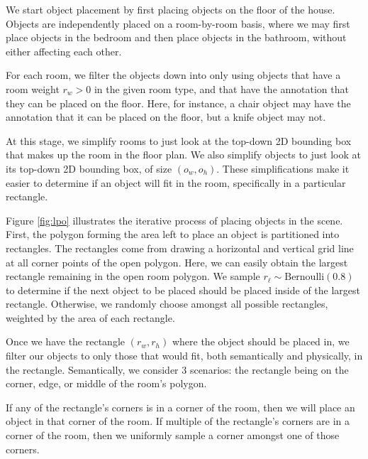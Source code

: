 We start object placement by first placing objects on the floor of the house. Objects are independently placed on a room-by-room basis, where we may first place objects in the bedroom and then place objects in the bathroom, without either affecting each other.

For each room, we filter the objects down into only using objects that have a room weight $r_w > 0$ in the given room type, and that have the annotation that they can be placed on the floor. Here, for instance, a chair object may have the annotation that it can be placed on the floor, but a knife object may not.


At this stage, we simplify rooms to just look at the top-down 2D bounding box that makes up the room in the floor plan. We also simplify objects to just look at its top-down 2D bounding box, of size $(o_w, o_h)$. These simplifications make it easier to determine if an object will fit in the room, specifically in a particular rectangle.

Figure \ref{fig:lpo} illustrates the iterative process of placing objects in the scene. First, the polygon forming the area left to place an object is partitioned into rectangles. The rectangles come from drawing a horizontal and vertical grid line at all corner points of the open polygon. Here, we can easily obtain the largest rectangle remaining in the open room polygon. We sample $r_\ell\sim \text{Bernoulli}(0.8)$ to determine if the next object to be placed should be placed inside of the largest rectangle. Otherwise, we randomly choose amongst all possible rectangles, weighted by the area of each rectangle.

Once we have the rectangle $(r_w, r_h)$ where the object should be placed in, we filter our objects to only those that would fit, both semantically and physically, in the rectangle. Semantically, we consider 3 scenarios: the rectangle being on the corner, edge, or middle of the room's polygon.

If any of the rectangle's corners is in a corner of the room, then we will place an object in that corner of the room. If multiple of the rectangle's corners are in a corner of the room, then we uniformly sample a corner amongst one of those corners.

